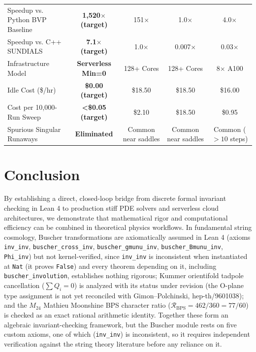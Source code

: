 \documentclass[11pt,a4paper]{article}
\begin{document}
\begin{table}[htbp]
{\begin{tabular}{lcccc}
Speedup vs. Python BVP Baseline & \textbf{1,520$\times$ (target)} & 151$\times$ & 1.0$\times$ & 4.0$\times$ \\
Speedup vs. C++ SUNDIALS & \textbf{7.1$\times$ (target)} & 1.0$\times$ & 0.007$\times$ & 0.03$\times$ \\
Infrastructure Model & \textbf{Serverless Min=0} & 128+ Cores & 128+ Cores & 8$\times$ A100 \\
Idle Cost (\$/hr) & \textbf{\$0.00 (target)} & \$18.50 & \$18.50 & \$16.00 \\
Cost per 10,000-Run Sweep & \textbf{<\$0.05 (target)} & \$2.10 & \$18.50 & \$0.95 \\
Spurious Singular Runaways & \textbf{Eliminated} & Common near saddles & Common near saddles & Common ($>10$ steps) \\
\bottomrule
\end{tabular}%
}
\end{table}
\section{Conclusion}
By establishing a direct, closed-loop bridge from discrete formal invariant checking in Lean 4 to production stiff PDE solvers and serverless cloud architectures, we demonstrate that mathematical rigor and computational efficiency can be combined in theoretical physics workflows. In fundamental string cosmology, Buscher transformations are axiomatically assumed in Lean 4 (axioms \texttt{inv\_inv}, \texttt{buscher\_cross\_inv}, \texttt{buscher\_gmunu\_inv}, \texttt{buscher\_Bmunu\_inv}, \texttt{Phi\_inv}) but not kernel-verified, since \texttt{inv\_inv} is inconsistent when instantiated at \texttt{Nat} (it proves \texttt{False}) and every theorem depending on it, including \texttt{buscher\_involution}, establishes nothing rigorous; Kummer orientifold tadpole cancellation ($\sum Q_i = 0$) is analyzed with its status under revision (the O-plane type assignment is not yet reconciled with Gimon--Polchinski, hep-th/9601038); and the $M_{24}$ Mathieu Moonshine BPS character ratio ($\mathcal{R}_{\text{BPS}} = 462/360 = 77/60$) is checked as an exact rational arithmetic identity. Together these form an algebraic invariant-checking framework, but the Buscher module rests on five custom axioms, one of which (\texttt{inv\_inv}) is inconsistent, so it requires independent verification against the string theory literature before any reliance on it.
\end{document}
